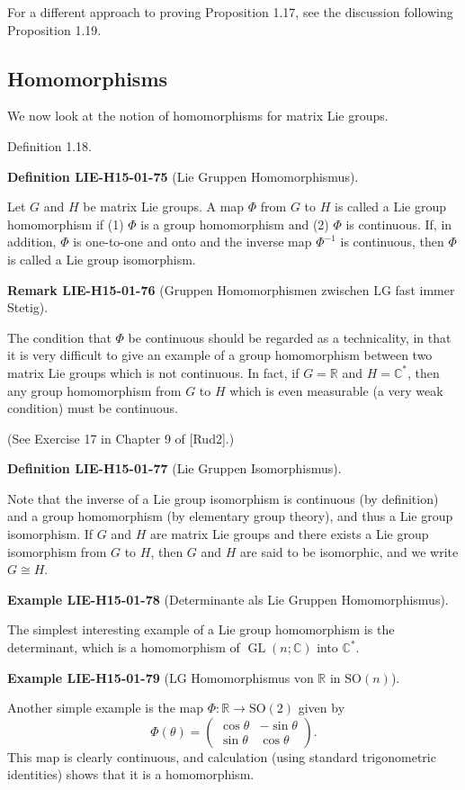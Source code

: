 \documentclass[10pt, letterpaper]{article}
\newcommand{\R}{\mathbb{R}}
\newcommand{\SO}{\mathrm{SO}}
\newcommand{\CustomHeading}[3]{%
  \par\medskip\noindent%
  \textbf{#1 #2} \textnormal{(#3)}.\enskip%
}
\newenvironment{DEF}[2]{\begin{unitbox}\CustomHeading{Definition}{#1}{#2}}{\end{unitbox}}
\newenvironment{REM}[2]{\begin{unitbox}\CustomHeading{Remark}{#1}{#2}}{\end{unitbox}}
\newenvironment{EXA}[2]{\begin{unitbox}\CustomHeading{Example}{#1}{#2}}{\end{unitbox}}
\begin{document}
For a different approach to proving Proposition 1.17, see the discussion following Proposition 1.19.

\subsection*{Homomorphisms}
We now look at the notion of homomorphisms for matrix Lie groups.

Definition 1.18. 


\begin{DEF}{LIE-H15-01-75}{Lie Gruppen Homomorphismus}
Let $G$ and $H$ be matrix Lie groups. A map $\Phi$ from $G$ to $H$ is called a Lie group homomorphism if (1) $\Phi$ is a group homomorphism and (2) $\Phi$ is continuous. If, in addition, $\Phi$ is one-to-one and onto and the inverse map $\Phi^{-1}$ is continuous, then $\Phi$ is called a Lie group isomorphism.
\end{DEF}

\begin{REM}{LIE-H15-01-76}{Gruppen Homomorphismen zwischen LG fast immer Stetig}
The condition that $\Phi$ be continuous should be regarded as a technicality, in that it is very difficult to give an example of a group homomorphism between two matrix Lie groups which is not continuous. In fact, if $G=\mathbb{R}$ and $H=\mathbb{C}^{*}$, then any group homomorphism from $G$ to $H$ which is even measurable (a very weak condition) must be continuous.
\end{REM}

(See Exercise 17 in Chapter 9 of [Rud2].)

\begin{DEF}{LIE-H15-01-77}{Lie Gruppen Isomorphismus}
Note that the inverse of a Lie group isomorphism is continuous (by definition) and a group homomorphism (by elementary group theory), and thus a Lie group isomorphism. If $G$ and $H$ are matrix Lie groups and there exists a Lie group isomorphism from $G$ to $H$, then $G$ and $H$ are said to be isomorphic, and we write $G \cong H$.
\end{DEF}

\begin{EXA}{LIE-H15-01-78}{Determinante als Lie Gruppen Homomorphismus}
The simplest interesting example of a Lie group homomorphism is the determinant, which is a homomorphism of $\operatorname{GL}(n ; \mathbb{C})$ into $\mathbb{C}^{*}$.
\end{EXA}


\begin{EXA}{LIE-H15-01-79}{LG Homomorphismus von $\R$ in $\SO(n)$}
Another simple example is the map $\Phi: \mathbb{R} \rightarrow \mathrm{SO}(2)$ given by
$$
\Phi(\theta)=\left(\begin{array}{rr}
\cos \theta & -\sin \theta \\
\sin \theta & \cos \theta
\end{array}\right) .
$$
This map is clearly continuous, and calculation (using standard trigonometric identities) shows that it is a homomorphism.
\end{EXA}
\end{document}
